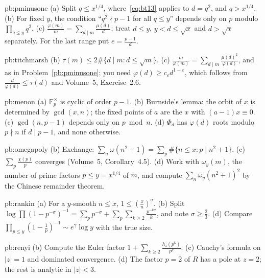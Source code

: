 \begin{hint}{pb:pminusone}
(a) Split $q\le x^{1/4}$, where~\eqref{eq:bt13} applies to $d=q^2$, and $q>x^{1/4}$. (b) For fixed $y$, the condition ``$q^2\nmid p-1$ for all $q\le y$'' depends only on $p$
modulo $\prod_{q\le y}q^2$. (c) $\frac{\varphi(m)}m=\sum_{d\mid m}\frac{\mu(d)}d$; treat $d\le y$, $y<d\le\sqrt x$ and $d>\sqrt x$ separately. For the last range put $e=\frac{p-1}d$.
\end{hint}

\begin{hint}{pb:titchmarsh}
(b) $\tau(m)\le2\#\{d\mid m:d\le\sqrt m\}$. (c) $\frac m{\varphi(m)}=\sum_{d\mid m}\frac{\mu(d)^2}{\varphi(d)}$, and as in Problem~\ref{pb:pminusone}; you need $\varphi(d)\ge c_\varepsilon d^{1-\varepsilon}$,
which follows from $\frac d{\varphi(d)}\le\tau(d)$ and Volume~5, Exercise~2.6.
\end{hint}

\begin{hint}{pb:menon}
(a) $\mathbb F_p^\times$ is cyclic of order $p-1$. (b) Burnside's lemma: the orbit of $x$ is determined by $\gcd(x,n)$; the fixed points of $a$ are the $x$ with $(a-1)x\equiv0$.
(c) $\gcd(n,p-1)$ depends only on $p\bmod n$. (d) $\Phi_d$ has $\varphi(d)$ roots modulo $p\nmid n$ if $d\mid p-1$, and none otherwise.
\end{hint}

\begin{hint}{pb:omegapoly}
(b) Exchange: $\sum_n\omega(n^2+1)=\sum_p\#\{n\le x:p\mid n^2+1\}$. (c) $\sum_p\frac{\chi(p)}p$ converges (Volume~5, Corollary~4.5). (d) Work with $\omega_y(m)$, the number of prime
factors $p\le y=x^{1/4}$ of $m$, and compute $\sum_n\omega_y(n^2+1)^2$ by the Chinese remainder theorem.
\end{hint}

\begin{hint}{pb:rankin}
(a) For a $y$-smooth $n\le x$, $1\le(\frac xn)^\sigma$. (b) Split $\log\prod(1-p^{-\sigma})^{-1}=\sum_pp^{-\sigma}+\sum_p\sum_{k\ge2}\frac{p^{-k\sigma}}k$, and note $\sigma\ge\frac23$.
(d) Compare $\prod_{p\le y}(1-\frac1p)^{-1}\sim e^\gamma\log y$ with the true size.
\end{hint}

\begin{hint}{pb:renyi}
(b) Compute the Euler factor $1+\sum_{k\ge2}\frac{h_z(p^k)}{p^k}$. (c) Cauchy's formula on $|z|=1$ and dominated convergence. (d) The factor $p=2$ of $R$ has a pole at $z=2$; the rest
is analytic in $|z|<3$.
\end{hint}

